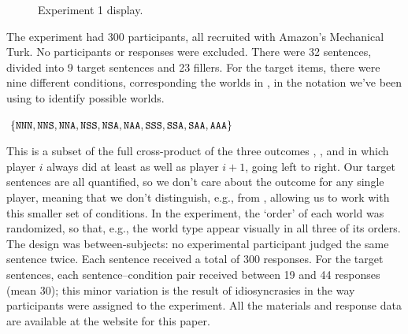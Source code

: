\documentclass[leqno]{article}
\begin{document}
\begin{figure}[t]
  \centering
  \caption{Experiment 1 display.}
  \label{fig:exp1}
\end{figure}

The experiment had 300 participants, all recruited with Amazon's
Mechanical Turk. No participants or responses were excluded.  There
were 32 sentences, divided into 9 target sentences and 23 fillers. For
the target items, there were nine different conditions, corresponding
the worlds in , in the notation we've been using to identify
possible worlds. 
%
\begin{examples}
\item\label{conds} $\left\{ \texttt{NNN}, \texttt{NNS}, \texttt{NNA},
    \texttt{NSS}, \texttt{NSA}, \texttt{NAA}, \texttt{SSS}, \texttt{SSA},
    \texttt{SAA}, \texttt{AAA} \right\}$
\end{examples}
%
This is a subset of the full cross-product of the three outcomes
, , and  in which player $i$ always did at
least as well as player $i+1$, going left to right.  Our target
sentences are all quantified, so we don't care about the outcome for
any single player, meaning that we don't distinguish, e.g.,
 from , allowing us to work with this smaller
set of conditions. In the experiment, the `order' of each world was
randomized, so that, e.g., the world type  appear visually
in all three of its orders.  The design was between-subjects: no
experimental participant judged the same sentence twice. Each sentence
received a total of 300 responses. For the target sentences, each
sentence--condition pair received between 19 and 44 responses (mean
30); this minor variation is the result of idiosyncrasies in the way
participants were assigned to the experiment. All the materials and
response data are available at the website for this paper.
\end{document}
